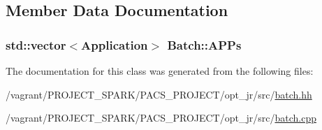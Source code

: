 \subsection{Member Data Documentation}
\hypertarget{classBatch_a757bf1a36fee46b1b47263ab4a59c560}{
\subsubsection[{A\-P\-Ps}]{\setlength{\rightskip}{0pt plus 5cm}std\-::vector$<${\bf Application}$>$ Batch\-::\-A\-P\-Ps}}\label{classBatch_a757bf1a36fee46b1b47263ab4a59c560}


The documentation for this class was generated from the following files\-:\begin{DoxyCompactItemize}
\item 
/vagrant/\-P\-R\-O\-J\-E\-C\-T\-\_\-\-S\-P\-A\-R\-K/\-P\-A\-C\-S\-\_\-\-P\-R\-O\-J\-E\-C\-T/opt\-\_\-jr/src/\hyperlink{batch_8hh}{batch.\-hh}\item 
/vagrant/\-P\-R\-O\-J\-E\-C\-T\-\_\-\-S\-P\-A\-R\-K/\-P\-A\-C\-S\-\_\-\-P\-R\-O\-J\-E\-C\-T/opt\-\_\-jr/src/\hyperlink{batch_8cpp}{batch.\-cpp}\end{DoxyCompactItemize}
